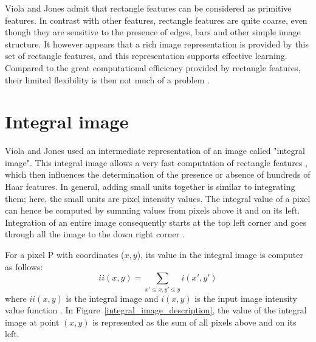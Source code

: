 \noindent Viola and Jones admit that rectangle features can be considered as primitive features. In contrast with other features, rectangle features are quite coarse, even though they are sensitive to the presence of edges, bars and other simple image structure. It however appears that a rich image representation is provided by this set of rectangle features, and this representation supports effective learning. Compared to the great computational efficiency provided by rectangle features, their limited flexibility is then not much of a problem \cite{VIO01}.
\newline

\section{Integral image}

\vspace{\baselineskip}
\noindent Viola and Jones used an intermediate representation of an image called "integral image". This integral image allows a very fast computation of rectangle features \cite{VIO01}, which then influences the determination of the presence or absence of hundreds of Haar features. In general, adding small units together is similar to integrating them; here, the small units are pixel intensity values. The integral value of a pixel can hence be computed by summing values from pixels above it and on its left. Integration of an entire image consequently starts at the top left corner and goes through all the image to the down right corner \cite{HEW07}.
\newline

\noindent For a pixel P with coordinates ($x,y$), its value in the integral image is computer as follows: \[ ii(x,y) = \sum_{x' \leq x,y' \leq y} i(x',y') \] where $ ii(x,y) $ is the integral image and $ i(x,y) $ is the input image intensity value function \cite{VIO01}. In Figure~\ref{integral_image_description}, the value of the integral image at point $ (x,y) $ is represented as the sum of all pixels above and on its left. 
\newline
	

